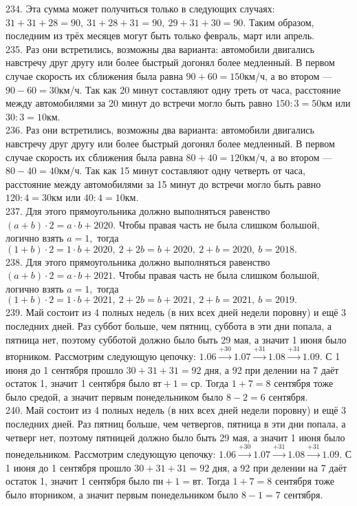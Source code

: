 234. Эта сумма может получиться только в следующих случаях: $31+31+28=90,\ 31+28+31=90,\ 29+31+30=90.$ Таким образом, последним из трёх месяцев могут быть только февраль, март или апрель.\\
235. Раз они встретились, возможны два варианта: автомобили двигались навстречу друг другу или более быстрый догонял более медленный. В первом случае скорость их сближения была равна $90+60=150$км/ч, а во втором --- $90-60=30$км/ч. Так как 20 минут составляют одну треть от часа, расстояние между автомобилями за 20 минут до встречи могло быть равно $150:3=50$км или $30:3=10$км.\\
236. Раз они встретились, возможны два варианта: автомобили двигались навстречу друг другу или более быстрый догонял более медленный. В первом случае скорость их сближения была равна $80+40=120$км/ч, а во втором --- $80-40=40$км/ч. Так как 15 минут составляют одну четверть от часа, расстояние между автомобилями за 15 минут до встречи могло быть равно $120:4=30$км или $40:4=10$км.\\
237. Для этого прямоугольника должно выполняться равенство $(a+b)\cdot2=a\cdot b+2020.$ Чтобы правая часть не была слишком большой, логично взять $a=1,$ тогда
$(1+b)\cdot 2=1\cdot b+2020,\ 2+2b=b+2020,\ 2+b=2020,\ b=2018.$\\
238. Для этого прямоугольника должно выполняться равенство $(a+b)\cdot2=a\cdot b+2021.$ Чтобы правая часть не была слишком большой, логично взять $a=1,$ тогда
$(1+b)\cdot 2=1\cdot b+2021,\ 2+2b=b+2021,\ 2+b=2021,\ b=2019.$\\
239. Май состоит из 4 полных недель (в них всех дней недели поровну) и ещё 3 последних дней. Раз суббот больше, чем пятниц, суббота в эти дни попала, а пятница нет, поэтому субботой должно было быть 29 мая, а значит 1 июня было вторником. Рассмотрим следующую цепочку:
$1.06\stackrel{+30}{\rightarrow}1.07\stackrel{+31}{\rightarrow}1.08\stackrel{+31}{\rightarrow}1.09.$ С 1 июня до 1 сентября прошло $30+31+31=92$ дня, а 92 при делении на 7 даёт остаток 1, значит 1 сентября было $\text{вт}+1=\text{ср}.$ Тогда $1+7=8$ сентября тоже было средой, а значит первым понедельником было $8-2=6$ сентября.\\
240. Май состоит из 4 полных недель (в них всех дней недели поровну) и ещё 3 последних дней. Раз пятниц больше, чем четвергов, пятница в эти дни попала, а четверг нет, поэтому пятницей должно было быть 29 мая, а значит 1 июня было понедельником. Рассмотрим следующую цепочку:
$1.06\stackrel{+30}{\rightarrow}1.07\stackrel{+31}{\rightarrow}1.08\stackrel{+31}{\rightarrow}1.09.$ С 1 июня до 1 сентября прошло $30+31+31=92$ дня, а 92 при делении на 7 даёт остаток 1, значит 1 сентября было $\text{пн}+1=\text{вт}.$ Тогда $1+7=8$ сентября тоже было вторником, а значит первым понедельником было $8-1=7$ сентября.\\
